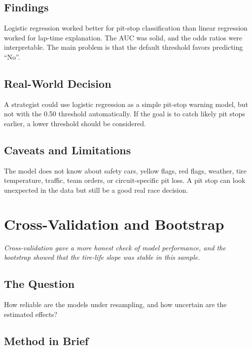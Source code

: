 \documentclass[11pt,oneside,openany]{book}
\newcommand{\chapterquote}[1]{%
\begin{center}
\small\textit{#1}
\end{center}
\vspace{-0.5em}
}
\begin{document}
\section{Findings}

Logistic regression worked better for pit-stop classification than linear regression worked for lap-time explanation. The AUC was solid, and the odds ratios were interpretable. The main problem is that the default threshold favors predicting ``No''.

\section{Real-World Decision}

A strategist could use logistic regression as a simple pit-stop warning model, but not with the 0.50 threshold automatically. If the goal is to catch likely pit stops earlier, a lower threshold should be considered.

\section{Caveats and Limitations}

The model does not know about safety cars, yellow flags, red flags, weather, tire temperature, traffic, team orders, or circuit-specific pit loss. A pit stop can look unexpected in the data but still be a good real race decision.


\chapter{Cross-Validation and Bootstrap}
\chapterquote{Cross-validation gave a more honest check of model performance, and the bootstrap showed that the tire-life slope was stable in this sample.}

\section{The Question}

How reliable are the models under resampling, and how uncertain are the estimated effects?

\section{Method in Brief}
\end{document}
